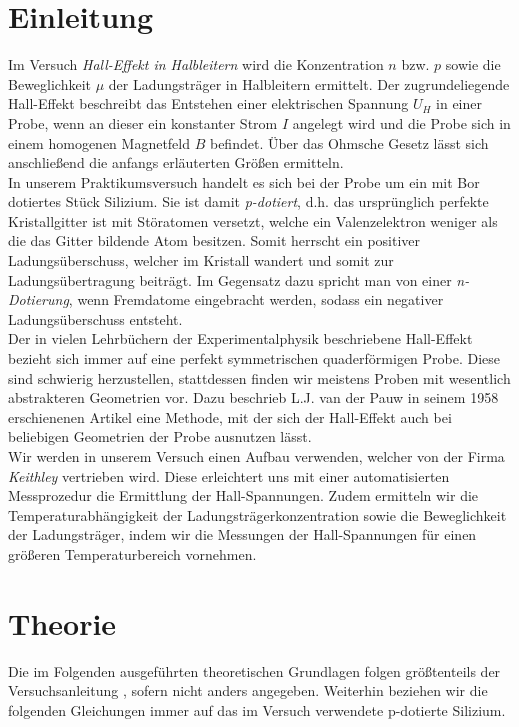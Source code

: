 \documentclass[a4paper,12pt]{article}
\begin{document}
\section{Einleitung}
Im Versuch \emph{Hall-Effekt in Halbleitern} wird die Konzentration $n$ bzw. $p$ sowie die Beweglichkeit $\mu$ der Ladungsträger in Halbleitern ermittelt. Der zugrundeliegende Hall-Effekt beschreibt das Entstehen einer elektrischen Spannung $U_H$ in einer Probe, wenn an dieser ein konstanter Strom $I$ angelegt wird und die Probe sich in einem homogenen Magnetfeld $B$ befindet. Über das Ohmsche Gesetz lässt sich anschließend die anfangs erläuterten Größen ermitteln.\\
In unserem Praktikumsversuch handelt es sich bei der Probe um ein mit Bor dotiertes Stück Silizium. Sie ist damit \emph{p-dotiert}, d.h. das ursprünglich perfekte Kristallgitter ist mit Störatomen versetzt, welche ein Valenzelektron weniger als die das Gitter bildende Atom besitzen. Somit herrscht ein positiver Ladungsüberschuss, welcher im Kristall wandert und somit zur Ladungsübertragung beiträgt. Im Gegensatz dazu spricht man von einer \emph{n-Dotierung}, wenn Fremdatome eingebracht werden, sodass ein negativer Ladungsüberschuss entsteht.\\
Der in vielen Lehrbüchern der Experimentalphysik beschriebene Hall-Effekt bezieht sich immer auf eine perfekt symmetrischen quaderförmigen Probe. Diese sind schwierig herzustellen, stattdessen finden wir meistens Proben mit wesentlich abstrakteren Geometrien vor. Dazu beschrieb L.J. van der Pauw in seinem 1958 erschienenen Artikel eine Methode, mit der sich der Hall-Effekt auch bei beliebigen Geometrien der Probe ausnutzen lässt.\\
Wir werden in unserem Versuch einen Aufbau verwenden, welcher von der Firma \emph{Keithley} vertrieben wird. Diese erleichtert uns mit einer automatisierten Messprozedur die Ermittlung der Hall-Spannungen. Zudem ermitteln wir die Temperaturabhängigkeit der Ladungsträgerkonzentration sowie die Beweglichkeit der Ladungsträger, indem wir die Messungen der Hall-Spannungen für einen größeren Temperaturbereich vornehmen.
\newpage
\section{Theorie}
Die im Folgenden ausgeführten theoretischen Grundlagen folgen größtenteils der Versuchsanleitung \cite{lit:manual}, sofern nicht anders angegeben.
Weiterhin beziehen wir die folgenden Gleichungen immer auf das im Versuch verwendete p-dotierte Silizium.
\end{document}

